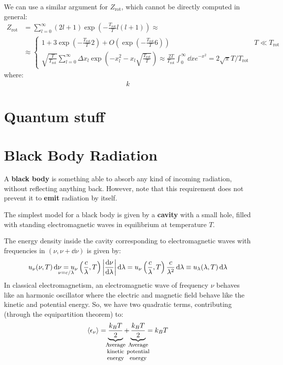 \documentclass[../../main.tex]{subfiles}
\begin{document}
We can use a similar argument for $Z_{\mathrm{rot}}$, which cannot be directly computed in general:
\begin{align*}
    Z_{\mathrm{rot}} &= \sum_{l=0}^{\infty} (2l+1) \exp\left(-\frac{T_{\mathrm{rot} }}{T} l(l+1) \right) \approx\\
    &\approx \begin{cases}
        1 + 3 \exp\left(-\frac{T_{\mathrm{rot} }}{T} 2 \right) + O\left(\exp\left(-\frac{T_{\mathrm{rot} }}{T} 6\right)\right) & T \ll T_{\mathrm{rot}}\\
        \sqrt{\frac{T}{T_{\mathrm{rot}}} } \sum_{l=0}^{\infty} \Delta x_l \exp\left({-x_l^2} - x_l \sqrt{\frac{T_{\mathrm{rot} }}{T} }\right) \approx \frac{2T}{T_{\mathrm{rot}}} \int_0^\infty \dd{x} e^{-x^2} = 2 \sqrt{\pi} T/T_{\mathrm{rot}} 
    \end{cases}
\end{align*}
where:
\begin{align*}
    k
\end{align*}

\section{Quantum stuff}

\section{Black Body Radiation}
A \textbf{black body} is something able to absorb any kind of incoming radiation, without reflecting anything back. However, note that this requirement does not prevent it to \textbf{emit} radiation by itself.

\medskip

The simplest model for a black body is given by a \textbf{cavity} with a small hole, filled with standing electromagnetic waves in equilibrium at temperature $T$. 

\medskip

The energy density inside the cavity corresponding to electromagnetic waves with frequencies in $(\nu, \nu+\dd{\nu})$ is given by:
\begin{align*}
    u_{\nu}(\nu, T) \dd{\nu} \underset{\mathclap{\nu = c/\lambda}}{=}  u_\nu \left(\frac{c}{\lambda}, T \right) \left|\dv{\nu}{\lambda}\right|\dd{\lambda} = u_{\nu} \left(\frac{c}{\lambda}, T \right) \frac{c}{\lambda^2} \dd{\lambda} \equiv u_{\lambda}(\lambda, T) \dd{\lambda} 
\end{align*}
In classical electromagnetism, an electromagnetic wave of frequency $\nu$ behaves like an harmonic oscillator where the electric and magnetic field behave like the kinetic and potential energy. So, we have two quadratic terms, contributing (through the equipartition theorem) to:
\begin{align*}
    \langle \epsilon_\nu \rangle = \underbrace{\frac{k_B T}{2}}_{\mathclap{\parbox{5em}{\footnotesize\centering Average kinetic energy}}}  + \underbrace{\frac{k_B T}{2}}_{\mathclap{\parbox{5em}{\footnotesize\centering Average potential energy}}}   = k_B T  
\end{align*}
\end{document}
